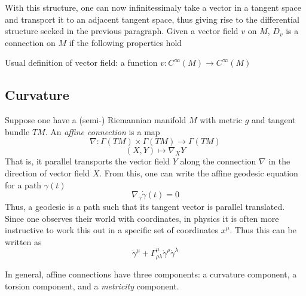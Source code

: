 With this structure, one can now infinitessimaly take a vector in a tangent space and transport it to an adjacent tangent space, thus giving rise to the differential structure seeked in the previous paragraph. Given a vector field $v$ on $M$, $D_v$ is a connection on $M$ if the following properties hold

Usual definition of vector field: a function $v:C^\infty(M) \rightarrow C^\infty(M)$

\subsection{Curvature}
Suppose one have a (semi-) Riemannian manifold $M$ with metric $g$ and tangent bundle $TM$. An \textit{affine connection} is a map
\begin{equation}
	\nabla : \Gamma (TM) \times \Gamma (TM) \rightarrow \Gamma (TM)
\end{equation}
\begin{equation}
	(X,Y) \mapsto \nabla_X Y
\end{equation}
That is, it parallel transports the vector field $Y$ along the connection $\nabla$ in the direction of vector field $X$. From this, one can write the affine geodesic equation for a path $\gamma(t)$
\begin{equation}
	\nabla_{\dot\gamma} \dot\gamma(t) = 0
\end{equation}
Thus, a geodesic is a path such that its tangent vector is parallel translated. Since one observes their world with coordinates, in physics it is often more instructive to work this out in a specific set of coordinates $x^\mu$. Thus this can be written as
\begin{equation}
	\ddot{\gamma}^\mu + \Gamma^{\mu}_{\rho\lambda}\dot{\gamma}^\rho \dot{\gamma}^\lambda 
\end{equation}

In general, affine connections have three components: a curvature component, a torsion component, and a \textit{metricity} component. 

